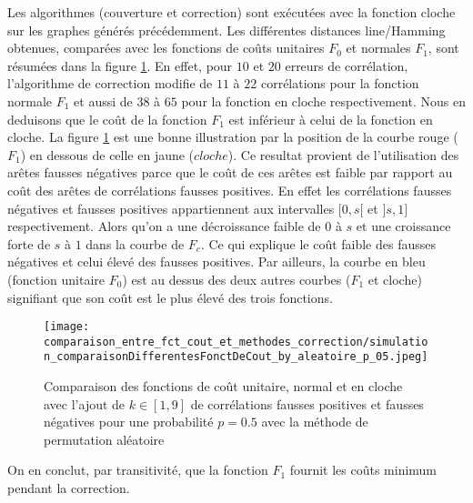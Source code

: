 \documentclass[onecolumn, 12pt]{book}
\begin{document}
Les algorithmes (couverture et correction) sont ex\'ecut\'ees avec la fonction cloche sur les graphes g\'en\'er\'es pr\'ec\'edemment. 
Les diff\'erentes distances line/Hamming obtenues, compar\'ees avec les fonctions de co\^uts unitaires $F_0$ et normales $F_1$, sont r\'esum\'ees dans la figure \ref{comparaison_fct_cloche_unitaire_normal_p05}.
En effet, pour $10$ et $20$ erreurs de corr\'elation, l'algorithme de correction modifie  de $11$ \`a $22$ corr\'elations pour la fonction normale $F_1$ et aussi de $38$ \`a $65$ pour la fonction en cloche respectivement. 
Nous en deduisons que le co\^ut de la fonction $F_1$ est  inf\'erieur \`a celui de la fonction en cloche. 
La figure \ref{comparaison_fct_cloche_unitaire_normal_p05}  est une bonne illustration par la position de la courbe rouge ($F_1$) en dessous de celle en jaune ($cloche$).
\newline
Ce resultat provient de l'utilisation des ar\^etes fausses n\'egatives parce que le co\^ut de ces ar\^etes est faible par rapport au co\^ut des ar\^etes de corr\'elations fausses positives.
En effet les corr\'elations fausses n\'egatives et fausses positives appartiennent aux intervalles $[0,s[$ et $]s,1]$ respectivement. 
Alors qu'on a une d\'ecroissance faible de $0$ \`a $s$ et une croissance forte de $s$ \`a $1$ dans la courbe de $F_c$. 
Ce qui explique le co\^ut faible des fausses n\'egatives et celui \'elev\'e des fausses positives. 
Par ailleurs, la courbe en bleu (fonction unitaire $F_0$) est au dessus des deux autres courbes ($F_1$ et cloche) signifiant que son co\^ut est le plus \'elev\'e des trois fonctions.
\newline
\begin{figure}[htb!] 
\centering
\texttt{[image: comparaison\_entre\_fct\_cout\_et\_methodes\_correction/simulation\_comparaisonDifferentesFonctDeCout\_by\_aleatoire\_p\_05.jpeg]}
\caption{ Comparaison des fonctions de co\^ut unitaire, normal et en cloche avec l'ajout de $k \in [1,9]$ de corr\'elations fausses positives et fausses n\'egatives pour une probabilit\'e $p = 0.5$ avec la m\'ethode de permutation al\'eatoire }
\label{comparaison_fct_cloche_unitaire_normal_p05} 
\end{figure}
On en conclut, par transitivit\'e, que la fonction $F_1$ fournit les co\^uts minimum pendant la correction.

\end{document}
